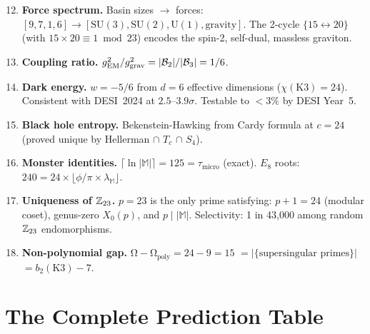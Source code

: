 \documentclass[12pt,a4paper]{article}
\theoremstyle{definition}\newtheorem{definition}[theorem]{Definition}
\theoremstyle{remark}\newtheorem{remark}[theorem]{Remark}
\renewcommand{\O}{\mathrm{\Omega}}
\newcommand{\Monster}{\mathbb{M}}\newcommand{\Leech}{\Lambda_{24}}
\begin{document}
\begin{enumerate}
\setcounter{enumi}{11}
  \item \textbf{Force spectrum.} Basin sizes $\to$ forces:
  $[9, 7, 1, 6] \to [\mathrm{SU}(3), \mathrm{SU}(2), \mathrm{U}(1), \text{gravity}]$.
  The 2-cycle $\{15 \leftrightarrow 20\}$ (with $15 \times 20 \equiv 1 \bmod 23$)
  encodes the spin-2, self-dual, massless graviton.

  \item \textbf{Coupling ratio.}
  $g_{\mathrm{EM}}^2/g_{\mathrm{grav}}^2 = |\mathcal{B}_2|/|\mathcal{B}_3| = 1/6$.

  \item \textbf{Dark energy.} $w = -5/6$ from $d = 6$ effective dimensions
  ($\chi(\mathrm{K3}) = 24$). Consistent with DESI~2024 at $2.5$--$3.9\sigma$.
  Testable to $<3\%$ by DESI Year~5.

  \item \textbf{Black hole entropy.} Bekenstein-Hawking from Cardy formula at
  $c = 24$ (proved unique by Hellerman $\cap$ $T_c$ $\cap$ $S_4$).

  \item \textbf{Monster identities.}
  $\lceil \ln|\Monster| \rceil = 125 = \tau_{\mathrm{micro}}$ (exact).
  $E_8$ roots: $240 = 24 \times \lfloor \phi/\pi \times \lambda_\Monster \rfloor$.

  \item \textbf{Uniqueness of $\mathbb{Z}_{23}$.} $p = 23$ is the only prime satisfying:
  $p + 1 = 24$ (modular coset), genus-zero $X_0(p)$, and $p \mid |\Monster|$.
  Selectivity: 1 in 43{,}000 among random $\mathbb{Z}_{23}$ endomorphisms.

  \item \textbf{Non-polynomial gap.} $\O - \O_{\mathrm{poly}} = 24 - 9 = 15$
  $= |\{\text{supersingular primes}\}|$ $= b_2(\mathrm{K3}) - 7$.
\end{enumerate}

\section{The Complete Prediction Table}
\label{sec:predictions}
\end{document}
